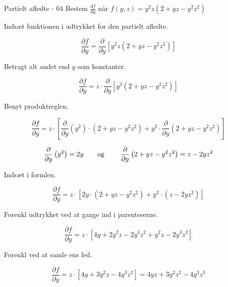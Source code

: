 \documentclass{article}
\begin{document}
\begin{exercise}{Partielt afledte - 04}
	Bestem $\frac{df}{dy}$ når $f(y,z) = y^2z\left(2+yz-y^2z^2\right)$ 
	
	
	\hint
	Indsæt funktionen i udtrykket for den partielt afledte.
	
	\hint
	
	\[
	\frac{\partial f}{\partial y} = \frac{\partial }{\partial y} \left[y^2z\left(2+yz-y^2z^2\right)\right]
	\]
	
	\hint
	Betragt alt andet end $y$ som konstanter.
	
	\hint
	\[
	\frac{\partial f}{\partial y} = z \cdot \frac{\partial }{\partial y} \left[ y^2\left(2+yz-y^2z^2\right) \right]
	\]
	
	\hint
	
	Benyt produktreglen.
	
	\hint
	\[
	\frac{\partial f}{\partial y} = z \cdot \left[\frac{\partial }{\partial y}\left(y^2 \right) \cdot \left(2 + yz -y^2z^2 \right) + y^2 \cdot \frac{\partial}{\partial y} \left(2+yz-y^2z^2\right) \right]
	\]
	
	\hint
	\[\frac{\partial }{\partial y} \left(y^2\right) = 2y \textrm{\qquad og \qquad} \frac{\partial }{\partial y} \left(2 + yz-y^2z^2\right) = z-2yz^2
	\]
	
	\hint
	Indsæt i formlen.
	
	\hint
	\[
	\frac{\partial f}{\partial y} = z \cdot \left[2y \cdot \left(2+yz-y^2z^2\right)  + y^2 \cdot (z-2yz^2) \right]
	\]
	
	\hint
	Forenkl udtrykket ved at gange ind i parenteserne.
	
	\hint
	\[
	\frac{\partial f}{\partial y} = z \cdot \left[4y + 2y^2z -2y^3z^2 + y^2z -2y^3z^2 \right]
	\]
	
	\hint Forenkl ved at samle ens led.

	\hint
	\[
	\frac{\partial f}{\partial y} = z \cdot \left[4y + 3y^2z -4y^3z^2 \right] = 4yz + 3y^2z^2 -4y^3z^3 
	\]
	
\end{exercise}

\newpage
\end{document}

